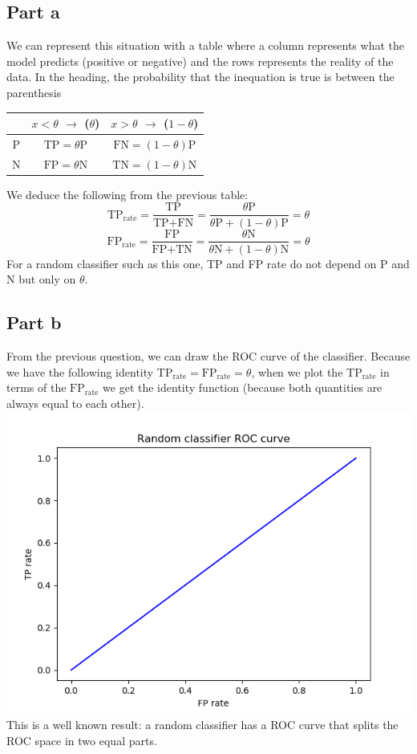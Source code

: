 \documentclass[a4paper, 10pt]{article}
\begin{document}
\subsection{Part a}
We can represent this situation with a table where a column represents what the model predicts (positive or negative)
and the rows represents the reality of the data. In the heading, the probability that the inequation is true is between the parenthesis
\\
\begin{center}
\begin{tabular}{ |c|c|c| }
    \hline
    \  & $x<\theta$ $\rightarrow$ ($\theta$) & $x>\theta$ $\rightarrow$ ($1-\theta$) \\
    \hline
    P & $\text{TP} = \theta \text{P}$ & $\text{FN} = (1-\theta) \text{P}$ \\
    N & $\text{FP} = \theta \text{N}$ & $\text{TN} = (1-\theta) \text{N}$ \\
    \hline
\end{tabular}
\end{center}
We deduce the following from the previous table:
$$
\text{TP}_{\text{rate}} = \frac{\text{TP}}{\text{TP}+\text{FN}} = \frac{\theta \text{P}}{\theta \text{P} +(1-\theta)\text{P}} = \theta
$$
$$
\text{FP}_{\text{rate}} = \frac{\text{FP}}{\text{FP}+\text{TN}} = \frac{\theta \text{N}}{\theta \text{N} + (1-\theta)\text{N}} = \theta
$$
For a random classifier such as this one, TP and FP rate do not depend
on P and N but only on $\theta$.

\subsection{Part b}
From the previous question, we can draw the ROC curve of the classifier.
Because we have the following identity $\text{TP}_\text{rate} = \text{FP}_\text{rate} = \theta$,
when we plot the $\text{TP}_\text{rate}$ in terms of the $\text{FP}_\text{rate}$ we get
the identity function (because both quantities are always equal to each other).
\\
\includegraphics{ex2b}
\\
This is a well known result: a random classifier has a ROC curve that
splits the ROC space in two equal parts.
\end{document}
